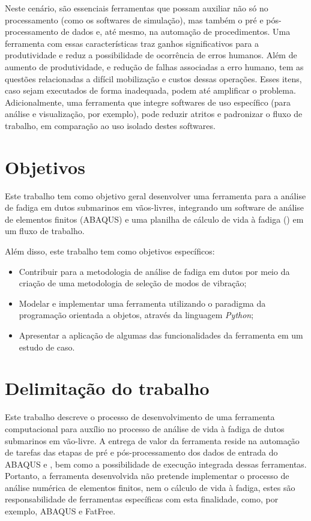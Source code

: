 Neste cenário, são essenciais ferramentas que possam auxiliar não só no processamento (como os softwares de simulação), mas também o pré e pós-processamento de dados e, até mesmo, na automação de procedimentos.
Uma ferramenta com essas características traz ganhos significativos para a produtividade e reduz a possibilidade de ocorrência de erros humanos.
Além de aumento de produtividade, e redução de falhas associadas a erro humano, tem as questões relacionadas a difícil mobilização e custos dessas operações. Esses itens, caso sejam executados de forma inadequada, podem até amplificar o problema.
Adicionalmente, uma ferramenta que integre softwares de uso específico (para análise e visualização, por exemplo), pode reduzir atritos e padronizar o fluxo de trabalho, em comparação ao uso isolado destes softwares.



\section{Objetivos}


Este trabalho tem como objetivo geral desenvolver uma ferramenta para a análise de fadiga em dutos submarinos em vãos-livres, integrando um software de análise de elementos finitos (ABAQUS) e uma planilha de cálculo de vida à fadiga (\fatfree) em um fluxo de trabalho.

Além disso, este trabalho tem como objetivos específicos:

\begin{itemize}
    \item Contribuir para a metodologia de análise de fadiga em dutos por meio da criação de uma metodologia de seleção de modos de vibração;
    \item Modelar e implementar uma ferramenta utilizando o paradigma da programação orientada a objetos, através da linguagem \textit{Python};
    \item Apresentar a aplicação de algumas das funcionalidades da ferramenta em um estudo de caso.
\end{itemize}


\section{Delimitação do trabalho}


Este trabalho descreve o processo de desenvolvimento de uma ferramenta computacional para auxílio no processo de análise de vida à fadiga de dutos submarinos em vão-livre. A entrega de valor da ferramenta reside na automação de tarefas das etapas de pré e pós-processamento dos dados de entrada do ABAQUS e \fatfree, bem como a possibilidade de execução integrada dessas ferramentas. Portanto, a ferramenta desenvolvida não pretende implementar o processo de análise numérica de elementos finitos, nem o cálculo de vida à fadiga, estes são responsabilidade de ferramentas específicas com esta finalidade, como, por exemplo, ABAQUS e FatFree.


